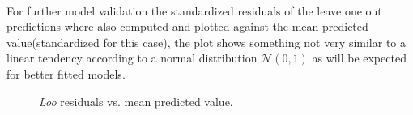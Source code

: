 \paragraph{}
For further model validation the standardized residuals of the leave one out
predictions where also computed and plotted against the mean predicted
value(standardized for this case), the plot shows something not very similar to a
linear tendency according to a normal distribution $\mathcal{N}(0,1)$ as will be
expected for better fitted models.

\begin{figure}[h]
	\centering
	
	\caption{\emph{Loo} residuals vs. mean predicted value.}
	\label{mlooresiduals_vs_real}
\end{figure}
